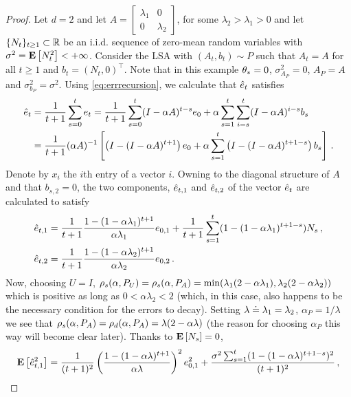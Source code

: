 \begin{proof}
Let $d=2$ and let
$A=\begin{bmatrix} \lambda_{1} &0\\ 0& \lambda_{2}\end{bmatrix}$, 
for some $\lambda_{2}>\lambda_{1}>0$ and let $\{N_t\}_{t\ge 1}\subset \mathbb{R}$ be an i.i.d. sequence of zero-mean random variables with $\sigma^2 = \mathbf{E}\left[ N_t^2 \right]<+\infty$.
Consider the LSA with $(A_t,b_t)\sim P$ such that 
$A_t=A$ for all $t\ge 1$ 
and $b_t = (N_t,0)^\top$.
Note that in this example $\theta_*=0$, $\sigma_{A_P}^2 = 0$, $A_P=A$ and $\sigma_{b_P}^2 = \sigma^2$.
Using \eqref{eq:errrecursion}, we calculate that $\hat{e}_t$ satisfies
\begin{align*}
\hat{e}_t&=\frac{1}{t+1}\sum_{s=0}^t e_t = \frac{1}{t+1}\sum_{s=0}^t (I-\alpha A)^{t-s} e_0 +\alpha \sum_{s=1}^t \sum_{i=s}^t (I-\alpha A)^{i-s} b_s\\
&=\frac{1}{t+1}(\alpha A)^{-1}\left[\left(I-(I-\alpha A)^{t+1}\right)e_0 + \alpha \sum_{s=1}^t \left(I-(I-\alpha A)^{t+1-s}\right) b_s\right]\,.
\end{align*}
Denote by $x_i$ the $i$th entry of a vector $i$.
Owning to the diagonal structure of $A$ and that $b_{s,2}=0$,
the two components, $\hat{e}_{t,1}$ and $\hat{e}_{t,2}$ of the vector $\hat{e}_t$ are calculated to satisfy
\begin{align*}
\hat{e}_{t,1} & =  \frac{1}{t+1} \frac{1-(1-\alpha \lambda_1)^{t+1}}{ \alpha \lambda_1} e_{0,1}
					+ \frac{1}{t+1} \sum_{s=1}^t (1-(1-\alpha \lambda_1)^{t+1-s}) N_s\,,\\
\hat{e}_{t,2} & =  \frac{1}{t+1} \frac{1-(1-\alpha \lambda_2)^{t+1}}{ \alpha \lambda_2} e_{0,2}\,.
\end{align*}
Now, choosing $U=I$, $\rho_s(\alpha,P_U) = \rho_s(\alpha,P_A) = \min( \lambda_1(2-\alpha \lambda_1), \lambda_2 (2-\alpha \lambda_2) )$ which is positive as long as $0<\alpha \lambda_2<2$ (which, in this case, also happens to be the necessary condition for the errors to decay).
Setting $\lambda \doteq \lambda_1=\lambda_2$,
$\alpha_P = 1/\lambda$ we see that 
$\rho_s(\alpha,P_A)=\rho_d(\alpha,P_A) = \lambda(2-\alpha \lambda)$ (the reason for choosing $\alpha_P$ this way will become clear later). 
Thanks to $\mathbf{E}\left[N_s\right]=0$,
\begin{align*}
\EE{\eh^2_{t,1}} =
 \frac{1}{(t+1)^2} \left(\frac{1-(1-\alpha \lambda)^{t+1}}{ \alpha \lambda}\right)^2 e_{0,1}^2
					+ \frac{ \sigma^2 \sum_{s=1}^t (1-(1-\alpha \lambda)^{t+1-s})^2 }{(t+1)^2}\,,

\end{align*}
\end{proof}
